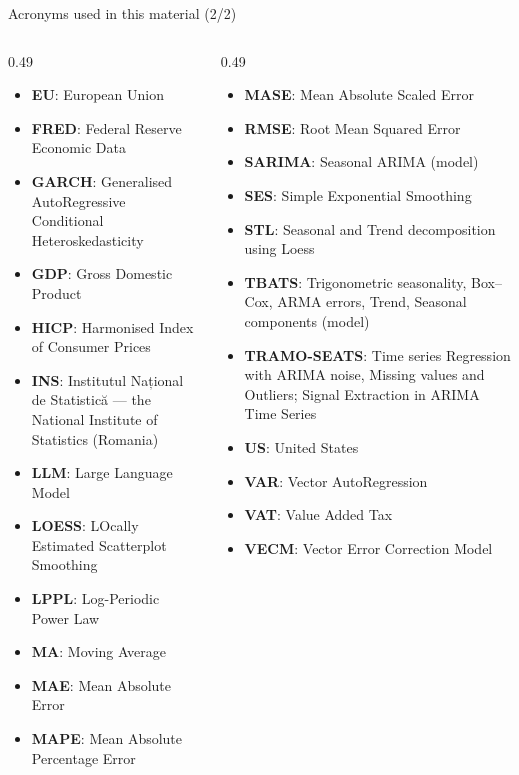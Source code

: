 \begin{frame}{Acronyms used in this material (2/2)}
\begin{columns}[T]
\begin{column}{0.49\textwidth}
\begin{itemize}\setlength{\itemsep}{0pt}
    \item \textbf{EU}: European Union
    \item \textbf{FRED}: Federal Reserve Economic Data
    \item \textbf{GARCH}: Generalised AutoRegressive Conditional Heteroskedasticity
    \item \textbf{GDP}: Gross Domestic Product
    \item \textbf{HICP}: Harmonised Index of Consumer Prices
    \item \textbf{INS}: Institutul Național de Statistică — the National Institute of Statistics (Romania)
    \item \textbf{LLM}: Large Language Model
    \item \textbf{LOESS}: LOcally Estimated Scatterplot Smoothing
    \item \textbf{LPPL}: Log-Periodic Power Law
    \item \textbf{MA}: Moving Average
    \item \textbf{MAE}: Mean Absolute Error
    \item \textbf{MAPE}: Mean Absolute Percentage Error
\end{itemize}
\end{column}
\begin{column}{0.49\textwidth}
\begin{itemize}\setlength{\itemsep}{0pt}
    \item \textbf{MASE}: Mean Absolute Scaled Error
    \item \textbf{RMSE}: Root Mean Squared Error
    \item \textbf{SARIMA}: Seasonal ARIMA (model)
    \item \textbf{SES}: Simple Exponential Smoothing
    \item \textbf{STL}: Seasonal and Trend decomposition using Loess
    \item \textbf{TBATS}: Trigonometric seasonality, Box–Cox, ARMA errors, Trend, Seasonal components (model)
    \item \textbf{TRAMO-SEATS}: Time series Regression with ARIMA noise, Missing values and Outliers; Signal Extraction in ARIMA Time Series
    \item \textbf{US}: United States
    \item \textbf{VAR}: Vector AutoRegression
    \item \textbf{VAT}: Value Added Tax
    \item \textbf{VECM}: Vector Error Correction Model
\end{itemize}
\end{column}
\end{columns}
\end{frame}

